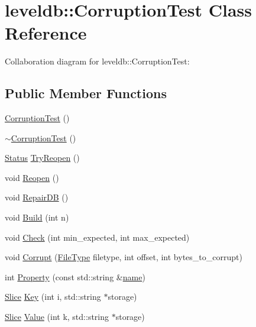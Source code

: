 \hypertarget{classleveldb_1_1_corruption_test}{\section{leveldb\-:\-:Corruption\-Test Class Reference}
\label{classleveldb_1_1_corruption_test}
}


Collaboration diagram for leveldb\-:\-:Corruption\-Test\-:
\subsection*{Public Member Functions}
\begin{DoxyCompactItemize}
\item 
\hyperlink{classleveldb_1_1_corruption_test_a9940767db260b1e4e60b8bcedc50217c}{Corruption\-Test} ()
\item 
\hyperlink{classleveldb_1_1_corruption_test_a4086f02f771d78d4ce242c14b0e392d9}{$\sim$\-Corruption\-Test} ()
\item 
\hyperlink{classleveldb_1_1_status}{Status} \hyperlink{classleveldb_1_1_corruption_test_aaba7c05f06400ef45d1af5cb95f66a57}{Try\-Reopen} ()
\item 
void \hyperlink{classleveldb_1_1_corruption_test_aa2051faee6b6542d35ebdcf99918a713}{Reopen} ()
\item 
void \hyperlink{classleveldb_1_1_corruption_test_aff36b45496c39a006a14df201ef7d57b}{Repair\-D\-B} ()
\item 
void \hyperlink{classleveldb_1_1_corruption_test_a54d2114311c61356e879b5ccfc3cda18}{Build} (int n)
\item 
void \hyperlink{classleveldb_1_1_corruption_test_aa03dcde1d0771ebbcf7d6ac8bda9c725}{Check} (int min\-\_\-expected, int max\-\_\-expected)
\item 
void \hyperlink{classleveldb_1_1_corruption_test_a22060ac0a3697640cdcf36973339b646}{Corrupt} (\hyperlink{namespaceleveldb_ab8e559ac5cadcb2b5dd531c60df944f1}{File\-Type} filetype, int offset, int bytes\-\_\-to\-\_\-corrupt)
\item 
int \hyperlink{classleveldb_1_1_corruption_test_aab1ed767d1cdac7e95a32ccf6defc709}{Property} (const std\-::string \&\hyperlink{testharness_8cc_a8f8f80d37794cde9472343e4487ba3eb}{name})
\item 
\hyperlink{classleveldb_1_1_slice}{Slice} \hyperlink{classleveldb_1_1_corruption_test_a157c0095fca3c0a2ccaf3b8647705469}{Key} (int i, std\-::string $\ast$storage)
\item 
\hyperlink{classleveldb_1_1_slice}{Slice} \hyperlink{classleveldb_1_1_corruption_test_a0afb6030faf43287b86e027a13eac152}{Value} (int k, std\-::string $\ast$storage)
\end{DoxyCompactItemize}
